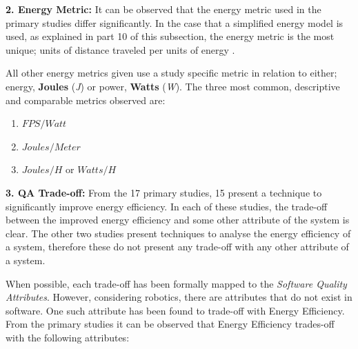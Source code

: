 \vspace{5mm}

\noindent\textbf{2. Energy Metric:} %
It can be observed that the energy metric used in the primary studies differ significantly.
In the case that a simplified energy model is used, as explained in part 10 of this subsection, the energy metric is the most unique;
units of distance traveled per units of energy \cite{mei2006mobile_exploration, patel2012exploration_strategy}.

All other energy metrics given use a study specific metric in relation to either; energy, \textbf{Joules} (\textit{J}) or power, \textbf{Watts} (\textit{W}).
The three most common, descriptive and comparable metrics observed are:
\begin{enumerate}
    \item $FPS / Watt$ \cite{cheng2018FPGA_image_recognition}
    \item $Joules / Meter$ \cite{licea2013wireless_comms}
    \item $Joules / H$ or $Watts / H$ \cite{kim2016firefighting_robot,barili1995efficient_motion}
\end{enumerate}

\vspace{5mm}

\noindent\textbf{3. QA Trade-off:}
From the 17 primary studies, 15 present a technique to significantly improve energy efficiency.
In each of these studies, the trade-off between the improved energy efficiency and some other attribute of the system is clear. 
The other two studies present techniques to analyse the energy efficiency of a system, therefore these do not present any trade-off with any other
attribute of a system.

\vspace{2mm}

When possible, each trade-off has been formally mapped to the \textit{Software Quality Attributes\cite{iso2011quality_attributes}}.
However, considering robotics, there are attributes that do not exist in software.
One such attribute has been found to trade-off with Energy Efficiency. 
From the primary studies it can be observed that Energy Efficiency trades-off with the following attributes:

